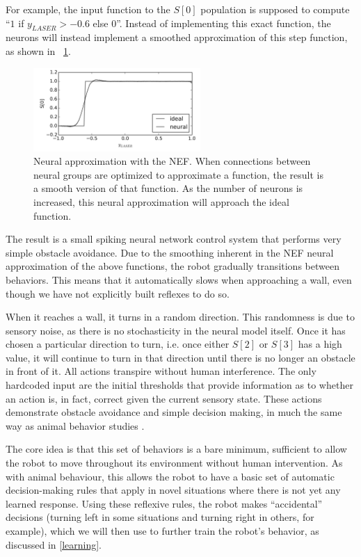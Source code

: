 \documentclass[conference]{IEEEtran}
\begin{document}
For example, the input function to 
the $S[0]$ population is supposed to compute ``$1$ if $y_{LASER} > -0.6$ else $0$''. 
Instead of implementing this exact function, the neurons will instead implement
a smoothed approximation of this step function, as shown in
\figurename~\ref{NEF}.

\begin{figure}[!t]
\centering
\includegraphics[width=2.5in]{smoothing.png}
\caption{Neural approximation with the NEF. When connections between neural groups are optimized to approximate a function, the result is a smooth version of that function. As the number of neurons is increased, this neural approximation will approach the ideal function.}
\label{NEF}
\end{figure}

The result is a small spiking neural network control system that performs very 
simple obstacle avoidance. Due to the smoothing inherent in the NEF neural 
approximation of the above functions, the robot gradually transitions between 
behaviors. This means that it automatically slows when approaching a wall, 
even though we have not explicitly built reflexes to do so.  

When it reaches a wall, it turns in a random direction. This randomness is due 
to sensory noise, as there is no stochasticity in the neural model 
itself. Once it has chosen a particular direction to turn, i.e. once 
either $S[2]$ or $S[3]$ has a high value, it will continue to turn in that 
direction until there is no longer an obstacle in front of it. All actions 
transpire without human interference. The only hardcoded input are the initial 
thresholds that provide information as to whether an action is, in fact, 
correct given the current sensory state. These actions demonstrate obstacle 
avoidance and simple decision making, in much the same way as animal behavior 
studies \cite{kim2007encoding}. 

The core idea is that this set of behaviors is a bare minimum, sufficient to
allow the robot to move throughout its environment without human intervention.
As with animal behaviour, this allows the robot to have a basic set of automatic
decision-making rules that apply in novel situations where there is not yet
any learned response.  Using these reflexive rules, the robot makes ``accidental''
decisions (turning left in some situations and turning right in others, for
example), which we will then use to further train the robot's behavior, as
discussed in \ref{learning}.
\end{document}
